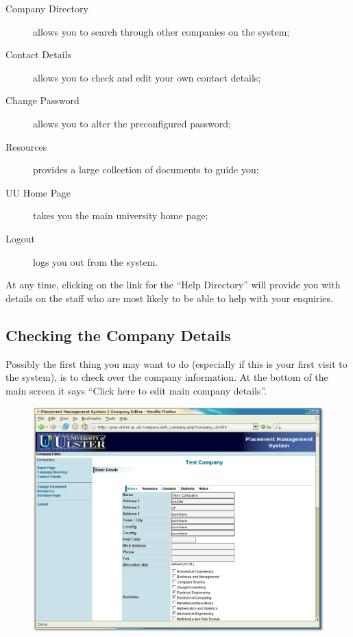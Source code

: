 \documentclass{article}
\begin{document}
\begin{description}
\item[Company Directory] allows you to search through other companies on the system;
\item[Contact Details] allows you to check and edit your own contact details;
\item[Change Password] allows you to alter the preconfigured password;
\item[Resources] provides a large collection of documents to guide you;
\item[UU Home Page] takes you the main university home page;
\item[Logout] logs you out from the system.
\end{description}

At any time, clicking on the link for the ``Help Directory'' will
provide you with details on the staff who are most likely to be
able to help with your enquiries.


\subsection{Checking the Company Details}

Possibly the first thing you may want to do (especially if this is your first visit to
the system), is to check over the company information. At the bottom of the main screen
it says ``Click here to edit main company details''.

\begin{figure}[htb]
\begin{center}
\includegraphics[scale=0.25]{png/company_hr2.png}
\end{center}
\end{figure}
\end{document}
